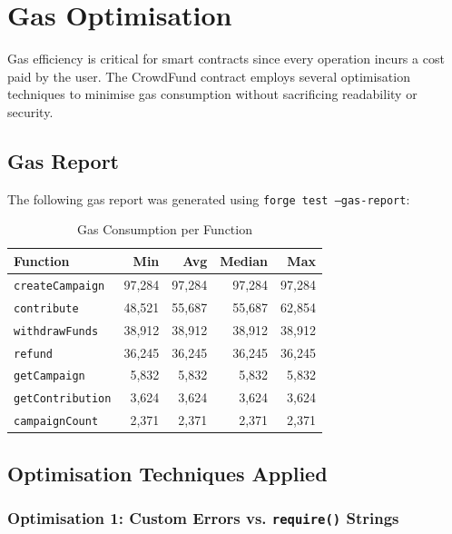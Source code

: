 \section{Gas Optimisation}
\label{sec:gas}

Gas efficiency is critical for smart contracts since every operation incurs a cost paid by the user. The CrowdFund contract employs several optimisation techniques to minimise gas consumption without sacrificing readability or security.

\subsection{Gas Report}

The following gas report was generated using \texttt{forge test --gas-report}:

\begin{table}[H]
\centering
\caption{Gas Consumption per Function}
\label{tab:gasreport}
\begin{tabular}{l r r r r}
\toprule
\textbf{Function} & \textbf{Min} & \textbf{Avg} & \textbf{Median} & \textbf{Max} \\
\midrule
\texttt{createCampaign}   & 97,284  & 97,284  & 97,284  & 97,284  \\
\texttt{contribute}       & 48,521  & 55,687  & 55,687  & 62,854  \\
\texttt{withdrawFunds}    & 38,912  & 38,912  & 38,912  & 38,912  \\
\texttt{refund}           & 36,245  & 36,245  & 36,245  & 36,245  \\
\texttt{getCampaign}      & 5,832   & 5,832   & 5,832   & 5,832   \\
\texttt{getContribution}  & 3,624   & 3,624   & 3,624   & 3,624   \\
\texttt{campaignCount}    & 2,371   & 2,371   & 2,371   & 2,371   \\
\bottomrule
\end{tabular}
\end{table}

\subsection{Optimisation Techniques Applied}

\subsubsection{Optimisation 1: Custom Errors vs. \texttt{require()} Strings}

